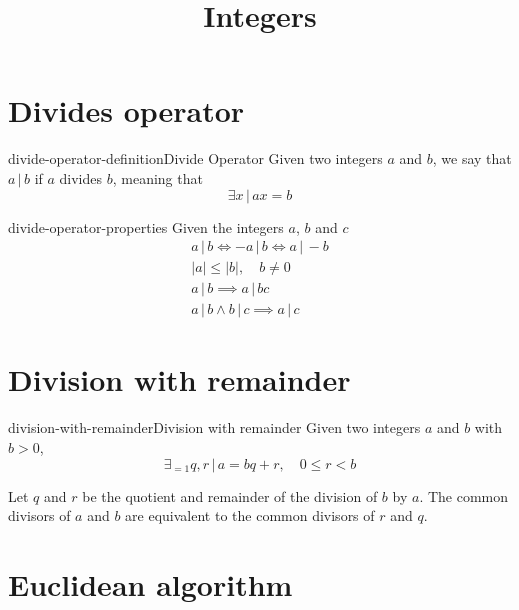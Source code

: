 \documentclass[preview]{standalone}
\newcommand{\divides}{\,|\,}
\begin{document}
\title{Integers}
\genpage

\section{Divides operator}

\begin{snippetdefinition}{divide-operator-definition}{Divide Operator}{
    Given two integers \(a\) and \(b\),
    we say that \(a \divides b\) if \(a\) divides \(b\),
    meaning that
    \[
        \exists x \,|\, ax = b
    \]
}
\end{snippetdefinition}

\begin{snippet}{divide-operator-properties}
Given the integers \(a\), \(b\) and \(c\)
\begin{align*}
    a \divides b \iff -a \divides b \iff a \divides -b \\
    |a| \leq |b|, \quad b \neq 0 \\
    a \divides b \implies a \divides bc \\
    a \divides b \land b \divides c \implies a \divides c
\end{align*}
\end{snippet}

\section{Division with remainder}

\begin{snippetproposition}{division-with-remainder}{Division with remainder}{
    Given two integers \(a\) and \(b\) with \(b > 0\),
    \[
        \exists_{=1} q,r \,|\, a=bq+r, \quad 0 \leq r < b
    \]
}
\end{snippetproposition}



Let \(q\) and \(r\) be the quotient and remainder of the division of \(b\)
by \(a\).
The common divisors of \(a\) and \(b\) are equivalent to the common divisors of \(r\) and \(q\).


\section{Euclidean algorithm}
\end{document}
